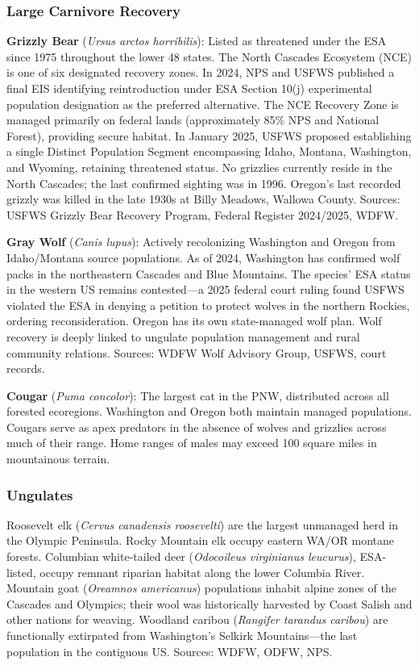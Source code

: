 \documentclass[11pt,letterpaper]{article}
\begin{document}
\subsubsection{Large Carnivore Recovery}

\textbf{Grizzly Bear} (\textit{Ursus arctos horribilis}): Listed as threatened under the ESA since 1975 throughout the lower 48 states. The North Cascades Ecosystem (NCE) is one of six designated recovery zones. In 2024, NPS and USFWS published a final EIS identifying reintroduction under ESA Section 10(j) experimental population designation as the preferred alternative. The NCE Recovery Zone is managed primarily on federal lands (approximately 85\% NPS and National Forest), providing secure habitat. In January 2025, USFWS proposed establishing a single Distinct Population Segment encompassing Idaho, Montana, Washington, and Wyoming, retaining threatened status. No grizzlies currently reside in the North Cascades; the last confirmed sighting was in 1996. Oregon's last recorded grizzly was killed in the late 1930s at Billy Meadows, Wallowa County. Sources: USFWS Grizzly Bear Recovery Program, Federal Register 2024/2025, WDFW.

\textbf{Gray Wolf} (\textit{Canis lupus}): Actively recolonizing Washington and Oregon from Idaho/Montana source populations. As of 2024, Washington has confirmed wolf packs in the northeastern Cascades and Blue Mountains. The species' ESA status in the western US remains contested---a 2025 federal court ruling found USFWS violated the ESA in denying a petition to protect wolves in the northern Rockies, ordering reconsideration. Oregon has its own state-managed wolf plan. Wolf recovery is deeply linked to ungulate population management and rural community relations. Sources: WDFW Wolf Advisory Group, USFWS, court records.

\textbf{Cougar} (\textit{Puma concolor}): The largest cat in the PNW, distributed across all forested ecoregions. Washington and Oregon both maintain managed populations. Cougars serve as apex predators in the absence of wolves and grizzlies across much of their range. Home ranges of males may exceed 100 square miles in mountainous terrain.

\subsubsection{Ungulates}
Roosevelt elk (\textit{Cervus canadensis roosevelti}) are the largest unmanaged herd in the Olympic Peninsula. Rocky Mountain elk occupy eastern WA/OR montane forests. Columbian white-tailed deer (\textit{Odocoileus virginianus leucurus}), ESA-listed, occupy remnant riparian habitat along the lower Columbia River. Mountain goat (\textit{Oreamnos americanus}) populations inhabit alpine zones of the Cascades and Olympics; their wool was historically harvested by Coast Salish and other nations for weaving. Woodland caribou (\textit{Rangifer tarandus caribou}) are functionally extirpated from Washington's Selkirk Mountains---the last population in the contiguous US. Sources: WDFW, ODFW, NPS.
\end{document}
